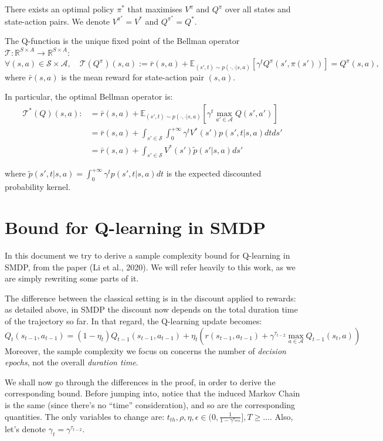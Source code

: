 \documentclass{article}
\begin{document}
There exists an optimal policy $\pi^*$ that maximises $V^{\pi}$ and $Q^{\pi}$ over all states and state-action pairs. We denote $V^{\pi^*} = V^*$ and $Q^{\pi^*} = Q^*$.

The Q-function is the unique fixed point of the Bellman operator $\mathcal{T}: \mathbb{R}^{S \times A} \to \mathbb{R}^{S \times A}$:
$$\forall (s, a) \in \mathcal{S} \times \mathcal{A}, \quad \mathcal{T}(Q^{\pi})(s, a) := \bar r(s, a) + \mathbb{E}_{(s', t) \sim p(\cdot, \cdot | s, a)} \left[ \gamma^t Q^{\pi}(s', \pi(s')) \right] = Q^{\pi}(s, a),$$
where $\bar r(s, a)$ is the mean reward for state-action pair $(s, a)$.

In particular, the optimal Bellman operator is:
\begin{align*}
  \mathcal{T^*}(Q)(s, a) :&= \bar r(s, a) + \mathbb{E}_{(s', t) \sim p(\cdot, \cdot | s, a)} \left[ \gamma^t \max_{a' \in \mathcal{A}} Q(s', a') \right]\\
  &= \bar r(s, a) + \int_{s' \in \mathcal{S}} \int_0^{+ \infty} \gamma^t V^*(s') p(s', t | s, a) dt ds' \\
  &= \bar r(s, a) + \int_{s' \in \mathcal{S}} V^*(s') \tilde p(s' | s, a) ds'
\end{align*}

where $\tilde p(s', t | s, a) = \int_0^{+\infty} \gamma^t p(s', t | s, a) dt$ is the expected discounted probability kernel.


\section{Bound for Q-learning in SMDP}

In this document we try to derive a sample complexity bound for Q-learning in SMDP, from the paper (Li et al., 2020). We will refer heavily to this work, as we are simply rewriting some parts of it.

The difference between the classical setting is in the discount applied to rewards: as detailed above, in SMDP the discount now depends on the total duration time of the trajectory so far. In that regard, the Q-learning update becomes:
$$Q_t(s_{t-1}, a_{t-1}) = (1 - \eta_t)Q_{t-1}(s_{t-1}, a_{t-1}) + \eta_t (r(s_{t-1}, a_{t-1}) + \gamma^{\tau_{t-2}} \max_{a\in \mathcal{A}} Q_{t-1} (s_t, a))$$
Moreover, the sample complexity we focus on concerns the number of \emph{decision epochs}, not the overall \emph{duration time}. 

We shall now go through the differences in the proof, in order to derive the corresponding bound. Before jumping into, notice that the induced Markov Chain is the same (since there's no ``time'' consideration), and so are the corresponding quantities. The only variables to change are: $t_{th}, \rho, \eta, \epsilon \in (0, \frac{1}{1 - \gamma^{\tau_{min}}}], T \geq \dots$. Also, let's denote $\gamma_t = \gamma^{\tau_{t-2}}$.\\[0.5cm]
\end{document}
